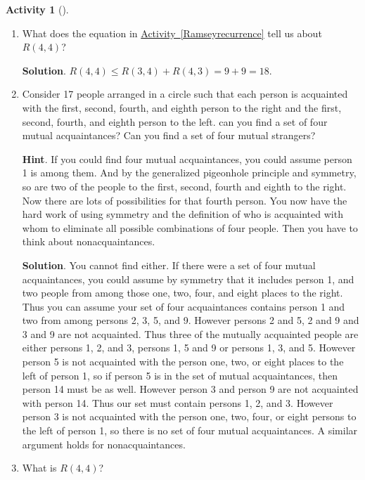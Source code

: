 \documentclass[10pt,]{book}
\theoremstyle{plain}
\theoremstyle{definition}
\theoremstyle{definition}
\theoremstyle{definition}
\newtheorem{activity}[project]{Activity}
\numberwithin{equation}{chapter}
\begin{document}
\begin{activity}[]\label{Ramseybound2}
\leavevmode%
\begin{enumerate}[font=\bfseries,label=(\alph*),ref=\alph*]
\item\label{task-58} \hypertarget{p-424}{}%
What does the equation in \hyperref[Ramseyrecurrence]{Activity~\ref{Ramseyrecurrence}} tell us about \(R(4,4)\)?%
\par\smallskip%
\noindent\textbf{Solution}.\hypertarget{solution-33}{}\quad%
\hypertarget{p-425}{}%
\(R(4,4)\le R(3,4) + R(4,3) =9+9 = 18\).%
\item\label{task-59} \hypertarget{p-426}{}%
Consider 17 people arranged in a circle such that each person is acquainted with the first, second, fourth, and eighth person to the right and the first, second, fourth, and eighth person to the left.  can you find a set of four mutual acquaintances?  Can you find a set of four mutual strangers?%
\par\smallskip%
\noindent\textbf{Hint}.\hypertarget{hint-23}{}\quad%
\hypertarget{p-427}{}%
If you could find four mutual acquaintances, you could assume person 1 is among them. And by the generalized pigeonhole principle and symmetry, so are two of the people to the first, second, fourth and eighth to the right. Now there are lots of possibilities for that fourth person. You now have the hard work of using symmetry and the definition of who is acquainted with whom to eliminate all possible combinations of four people. Then you have to think about nonacquaintances.%
\par\smallskip%
\noindent\textbf{Solution}.\hypertarget{solution-34}{}\quad%
\hypertarget{p-428}{}%
You cannot find either. If there were a set of four mutual acquaintances, you could assume by symmetry that it includes person 1, and two people from among those one, two, four, and eight places to the right. Thus you can assume your set of four acquaintances contains person 1 and two from among persons 2, 3, 5, and 9. However persons 2 and 5, 2 and 9 and 3 and 9 are not acquainted. Thus three of the mutually acquainted people are either persons 1, 2, and 3, persons 1, 5 and 9 or persons 1, 3, and 5. However person 5 is not acquainted with the person one, two, or eight places to the left of person 1, so if person 5 is in the set of mutual acquaintances, then person 14 must be as well. However person 3 and person 9 are not acquainted with person 14. Thus our set must contain persons 1, 2, and 3. However person 3 is not acquainted with the person one, two, four, or eight persons to the left of person 1, so there is no set of four mutual acquaintances. A similar argument holds for nonacquaintances.%
\item\label{task-60} \hypertarget{p-429}{}%
What is \(R(4,4)\)?%
\end{enumerate}
\end{activity}
\end{document}
